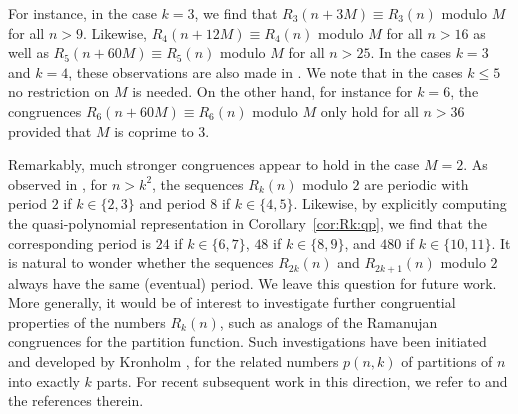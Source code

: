 \documentclass[11pt]{article}
\theoremstyle{plain}
\theoremstyle{definition}
\begin{document}
\begin{example}
  For instance, in the case $k = 3$, we find that $R_3 (n + 3 M) \equiv R_3
  (n)$ modulo $M$ for all $n > 9$. Likewise, $R_4 (n + 12 M) \equiv R_4 (n)$
  modulo $M$ for all $n > 16$ as well as $R_5 (n + 60 M) \equiv R_5 (n)$
  modulo $M$ for all $n > 25$. In the cases $k = 3$ and $k = 4$, these
  observations are also made in \cite{sharan-rook}. We note that in the
  cases $k \leq 5$ no restriction on $M$ is needed. On the other hand,
  for instance for $k = 6$, the congruences $R_6 (n + 60 M) \equiv R_6 (n)$
  modulo $M$ only hold for all $n > 36$ provided that $M$ is coprime to $3$.
\end{example}

Remarkably, much stronger congruences appear to hold in the case $M = 2$. As
observed in \cite{sharan-rook}, for $n > k^2$, the sequences $R_k (n)$
modulo $2$ are periodic with period $2$ if $k \in \{ 2, 3 \}$ and period $8$
if $k \in \{ 4, 5 \}$. Likewise, by explicitly computing the quasi-polynomial
representation in Corollary~\ref{cor:Rk:qp}, we find that the corresponding
period is $24$ if $k \in \{ 6, 7 \}$, $48$ if $k \in \{ 8, 9 \}$, and $480$ if
$k \in \{ 10, 11 \}$. It is natural to wonder whether the sequences $R_{2 k}
(n)$ and $R_{2 k + 1} (n)$ modulo $2$ always have the same (eventual) period.
We leave this question for future work. More generally, it would be of
interest to investigate further congruential properties of the numbers $R_k
(n)$, such as analogs of the Ramanujan congruences for the partition function.
Such investigations have been initiated and developed by Kronholm
\cite{kronholm-pnm}, \cite{kronholm-pnm-x} for the related numbers $p (n,
k)$ of partitions of $n$ into exactly $k$ parts. For recent subsequent work in
this direction, we refer to \cite{ekl-cranks-pnm} and the references
therein.
\end{document}
